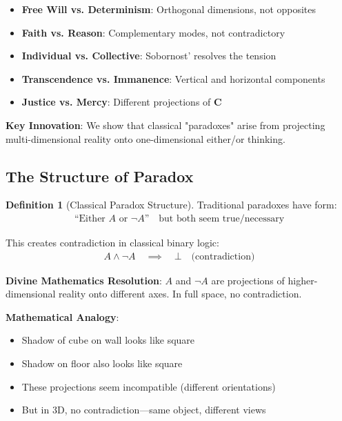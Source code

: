 \documentclass[11pt,a4paper]{article}
\theoremstyle{definition}
\newtheorem{definition}{Definition}[section]
\theoremstyle{remark}
\begin{document}
\begin{small}
\begin{enumerate}
\begin{mdframed}[backgroundcolor=cyan!5,linewidth=2pt]
\begin{itemize}[nosep]
    \item \textbf{Free Will vs. Determinism}: Orthogonal dimensions, not opposites
    \item \textbf{Faith vs. Reason}: Complementary modes, not contradictory
    \item \textbf{Individual vs. Collective}: Sobornost' resolves the tension
    \item \textbf{Transcendence vs. Immanence}: Vertical and horizontal components
    \item \textbf{Justice vs. Mercy}: Different projections of \(\mathbf{C}\)
\end{itemize}

\textbf{Key Innovation}: We show that classical "paradoxes" arise from projecting multi-dimensional reality onto one-dimensional either/or thinking.
\end{mdframed}

\subsection{The Structure of Paradox}

\begin{definition}[Classical Paradox Structure]
Traditional paradoxes have form:
\begin{align}
\text{``Either } A \text{ or } \neg A\text{''} \quad \text{but both seem true/necessary}
\end{align}

This creates contradiction in classical binary logic:
\begin{align}
A \land \neg A \quad \implies \quad \bot \quad \text{(contradiction)}
\end{align}

\textbf{Divine Mathematics Resolution}: \(A\) and \(\neg A\) are projections of higher-dimensional reality onto different axes. In full space, no contradiction.

\textbf{Mathematical Analogy}: 
\begin{itemize}
    \item Shadow of cube on wall looks like square
    \item Shadow on floor also looks like square
    \item These projections seem incompatible (different orientations)
    \item But in 3D, no contradiction—same object, different views
\end{itemize}
\end{definition}


\end{enumerate}
\end{small}
\end{document}
